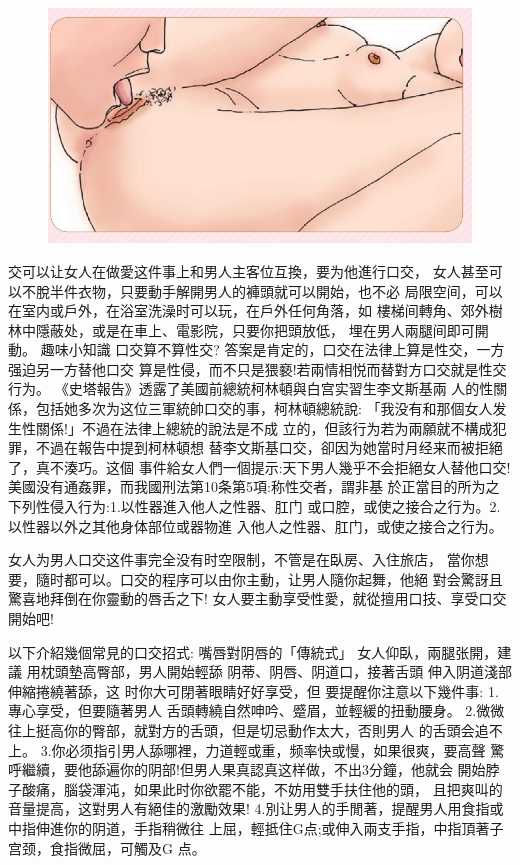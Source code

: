 \documentclass[12pt,UTF8]{ctexbook}
\begin{document}
\begin{figure}[htbp]
	\centering
	\includegraphics[width=0.7\linewidth]{19}
	\caption{}
	\label{fig:1}
\end{figure}

交可以让女人在做愛这件事上和男人主客位互換，要为他進行口交，
女人甚至可以不脫半件衣物，只要動手解開男人的褲頭就可以開始，也不必
局限空间，可以在室内或戶外，在浴室洗澡时可以玩，在戶外任何角落，如
樓梯间轉角、郊外樹林中隱蔽处，或是在車上、電影院，只要你把頭放低，
埋在男人兩腿间即可開動。
趣味小知識
口交算不算性交?
答案是肯定的，口交在法律上算是性交，一方强迫另一方替他口交
算是性侵，而不只是猥褻!若兩情相悦而替對方口交就是性交行为。
《史塔報告》透露了美國前總統柯林頓與白宫实習生李文斯基兩
人的性關係，包括她多次为这位三軍統帥口交的事，柯林頓總統說:
「我没有和那個女人发生性關係!」不過在法律上總統的說法是不成
立的，但該行为若为兩願就不構成犯罪，不過在報告中提到柯林頓想
替李文斯基口交，卻因为她當时月经来而被拒絕了，真不湊巧。这個
事件給女人們一個提示:天下男人幾乎不会拒絕女人替他口交!
美國没有通姦罪，而我國刑法第10条第5項:称性交者，謂非基
於正當目的所为之下列性侵入行为:1.以性器進入他人之性器、肛门
或口腔，或使之接合之行为。2.以性器以外之其他身体部位或器物進
入他人之性器、肛门，或使之接合之行为。

女人为男人口交这件事完全没有时空限制，不管是在臥房、入住旅店，
當你想要，隨时都可以。口交的程序可以由你主動，让男人隨你起舞，他絕
對会驚訝且驚喜地拜倒在你靈動的唇舌之下!
女人要主動享受性愛，就從擅用口技、享受口交開始吧!

以下介紹幾個常見的口交招式:
嘴唇對阴唇的「傳統式」
女人仰臥，兩腿张開，建議
用枕頭墊高臀部，男人開始輕舔
阴蒂、阴唇、阴道口，接著舌頭
伸入阴道淺部伸縮捲繞著舔，这
时你大可閉著眼睛好好享受，但
要提醒你注意以下幾件事:
1.專心享受，但要隨著男人
舌頭轉繞自然呻吟、蹙眉，並輕緩的扭動腰身。
2.微微往上挺高你的臀部，就對方的舌頭，但是切忌動作太大，否則男人
的舌頭会追不上。
3.你必须指引男人舔哪裡，力道輕或重，频率快或慢，如果很爽，要高聲
驚呼繼續，要他舔遍你的阴部!但男人果真認真这样做，不出3分鐘，他就会
開始脖子酸痛，腦袋渾沌，如果此时你欲罷不能，不妨用雙手扶住他的頭，
且把爽叫的音量提高，这對男人有絕佳的激勵效果!
4.別让男人的手閒著，提醒男人用食指或中指伸進你的阴道，手指稍微往
上屈，輕抵住G点;或伸入兩支手指，中指頂著子宫颈，食指微屈，可觸及G
点。
\end{document}
